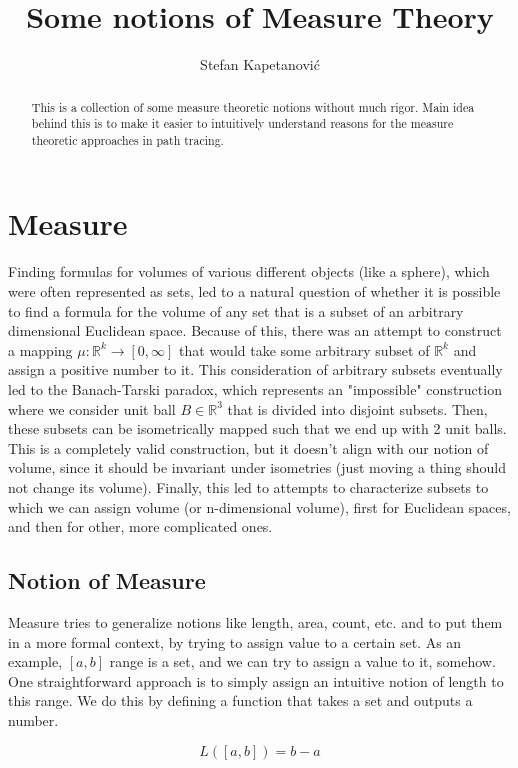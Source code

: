 \documentclass{article}
\title{Some notions of Measure Theory}
\author{Stefan Kapetanović}
\begin{document}
\maketitle

\begin{abstract}
This is a collection of some measure theoretic notions without much rigor. Main idea behind this is to make it easier to intuitively understand reasons for the measure theoretic approaches in path tracing.
\end{abstract}

\section{Measure}
Finding formulas for volumes of various different objects (like a sphere), which were often represented as sets, led to a natural question of whether it is possible to find a formula for the volume of any set that is a subset of an arbitrary dimensional Euclidean space. Because of this, there was an attempt to construct a mapping $\mu:\mathbb{R}^k\to[0,\infty]$ that would take some arbitrary subset of $\mathbb{R}^k$ and assign a positive number to it. This consideration of arbitrary subsets eventually led to the Banach-Tarski paradox, which represents an "impossible" construction where we consider unit ball $B\in\mathbb{R}^3$ that is divided into disjoint subsets. Then, these subsets can be isometrically mapped such that we end up with 2 unit balls. This is a completely valid construction, but it doesn't align with our notion of volume, since it should be invariant under isometries (just moving a thing should not change its volume). Finally, this led to attempts to characterize subsets to which we can assign volume (or n-dimensional volume), first for Euclidean spaces, and then for other, more complicated ones.

\subsection{Notion of Measure}
Measure tries to generalize notions like length, area, count, etc. and to put them in a more formal context, by trying to assign value to a certain set. As an example, $[a, b]$ range is a set, and we can try to assign a value to it, somehow. One straightforward approach is to simply assign an intuitive notion of length to this range. We do this by defining a function that takes a set and outputs a number.

\[ L([a, b]) = b - a \]
\end{document}
